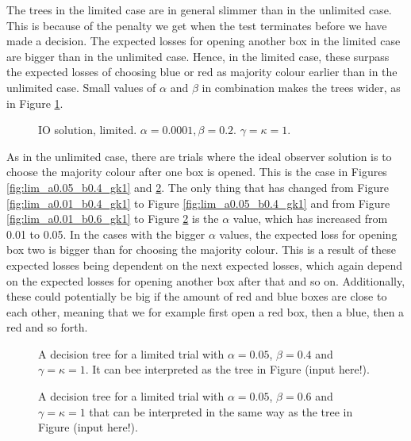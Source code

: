 The trees in the limited case are in general slimmer than in the unlimited case. This is because of the penalty we get when the test terminates before we have made a decision. The expected losses for opening another box in the limited case are bigger than in the unlimited case. Hence, in the limited case, these surpass the expected losses of choosing blue or red as majority colour earlier than in the unlimited case. Small values of $\alpha$ and $\beta$ in combination makes the trees wider, as in Figure \ref{fig:lim_a0.0001_b0.2_gk1}.
\begin{figure}
    \centering
    \scalebox{0.8}{}
    \caption[IO solution, limited. $\alpha=0.0001, \beta=0.2$. $\gamma=\kappa=1$.]{IO solution, limited. $\alpha=0.0001, \beta=0.2$. $\gamma=\kappa=1$.}
    \label{fig:lim_a0.0001_b0.2_gk1}
\end{figure}

As in the unlimited case, there are trials where the ideal observer solution is to choose the majority colour after one box is opened. This is the case in Figures \ref{fig:lim_a0.05_b0.4_gk1} and \ref{fig:lim_a0.05_b0.6_gk1}. The only thing that has changed from Figure \ref{fig:lim_a0.01_b0.4_gk1} to Figure \ref{fig:lim_a0.05_b0.4_gk1} and from Figure \ref{fig:lim_a0.01_b0.6_gk1} to Figure \ref{fig:lim_a0.05_b0.6_gk1} is the $\alpha$ value, which has increased from 0.01 to 0.05. In the cases with the bigger $\alpha$ values, the expected loss for opening box two is bigger than for choosing the majority colour. This is a result of these expected losses being dependent on the next expected losses, which again depend on the expected losses for opening another box after that and so on. Additionally, these could potentially be big if the amount of red and blue boxes are close to each other, meaning that we for example first open a red box, then a blue, then a red and so forth. 

\begin{figure}
    \centering
    \begin{minipage}[t]{0.45\textwidth} 
        \centering
        \scalebox{0.8}{}
        \caption{A decision tree for a limited trial with $\alpha = 0.05$, $\beta=0.4$ and $\gamma=\kappa=1$. It can bee interpreted as the tree in Figure (input here!).}
        \label{fig:lim_a0.05_b0.4_gk1}
    \end{minipage}\hfill
    \begin{minipage}[t]{0.45\textwidth} 
        \centering
        \scalebox{0.8}{}
        \caption{A decision tree for a limited trial with $\alpha = 0.05$, $\beta=0.6$ and $\gamma=\kappa=1$ that can be interpreted in the same way as the tree in Figure (input here!).}
        \label{fig:lim_a0.05_b0.6_gk1}
    \end{minipage}
\end{figure}

